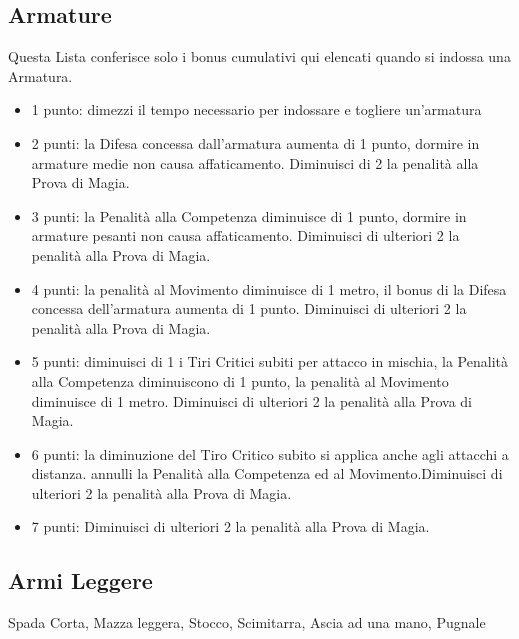 \begin{multicols}{2}
\subsection{Armature} \label{listaarmature}

Questa Lista conferisce solo i bonus cumulativi qui elencati quando si indossa una Armatura.

\begin{itemize}[leftmargin=*] \setlength{\itemsep}{0pt}

\item 1 punto: dimezzi il tempo necessario per indossare e togliere un'armatura
\item 2 punti: la Difesa concessa dall'armatura aumenta di 1 punto, dormire in armature medie non causa affaticamento. Diminuisci di 2 la penalità alla Prova di Magia.
\item 3 punti: la Penalità alla Competenza diminuisce di 1 punto, dormire in armature pesanti non causa affaticamento. Diminuisci di ulteriori 2 la penalità alla Prova di Magia.
\item 4 punti: la penalità al Movimento diminuisce di 1 metro, il bonus di la Difesa concessa dell'armatura aumenta di 1 punto. Diminuisci di ulteriori 2 la penalità alla Prova di Magia.
\item 5 punti: diminuisci di 1 i Tiri Critici subiti per attacco in mischia, la Penalità alla Competenza diminuiscono di 1 punto, la penalità al Movimento diminuisce di 1 metro. Diminuisci di ulteriori 2 la penalità alla Prova di Magia.
\item 6 punti: la diminuzione del Tiro Critico subito si applica anche agli attacchi a distanza. annulli la Penalità alla Competenza ed al Movimento.Diminuisci di ulteriori 2 la penalità alla Prova di Magia.
\item 7 punti: Diminuisci di ulteriori 2 la penalità alla Prova di Magia.
\end{itemize}

\subsection{Armi Leggere} Spada Corta, Mazza leggera, Stocco, Scimitarra, Ascia ad una mano, Pugnale\label{listaarmileggere}

\begin{itemize}[leftmargin=*] \setlength{\itemsep}{0pt}


\end{itemize}
\end{multicols}
